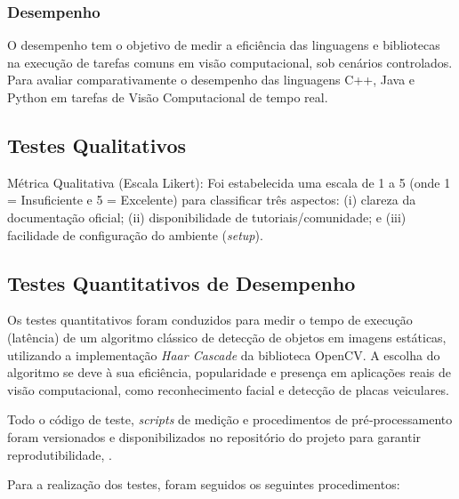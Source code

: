 \subsubsection{Desempenho}
O desempenho tem o objetivo de medir a eficiência das linguagens e bibliotecas na execução de tarefas comuns em visão computacional, sob cenários controlados. Para avaliar comparativamente o desempenho das linguagens C++, Java e Python em tarefas de Visão Computacional de tempo real.

\subsection{Testes Qualitativos}

Métrica Qualitativa (Escala Likert): Foi estabelecida uma escala de 1 a 5 (onde 1 = Insuficiente e 5 = Excelente) para classificar três aspectos: (i) clareza da documentação oficial; (ii) disponibilidade de tutoriais/comunidade; e (iii) facilidade de configuração do ambiente (\textit{setup}).

\subsection{Testes Quantitativos de Desempenho}
Os testes quantitativos foram conduzidos para medir o tempo de execução (latência) de um algoritmo clássico de detecção de objetos em imagens estáticas, utilizando a implementação \textit{Haar Cascade} da biblioteca OpenCV. A escolha do algoritmo se deve à sua eficiência, popularidade e presença em aplicações reais de visão computacional, como reconhecimento facial e detecção de placas veiculares.

Todo o código de teste, \textit{scripts} de medição e procedimentos de pré‑processamento foram versionados e disponibilizados no repositório do projeto para garantir reprodutibilidade, \citep{atomOrgGithub} .

Para a realização dos testes, foram seguidos os seguintes procedimentos:

